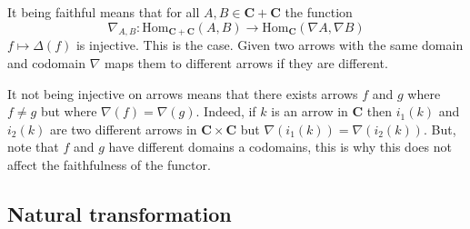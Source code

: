 \documentclass{book}
\theoremstyle{definition}
\newcommand\Hom{\text{Hom}}
\begin{document}
It being faithful means that for all $A, B \in \mathbf{C} + \mathbf{C}$ the function
\[
  \nabla_{A,B} : \Hom_{\mathbf{C}+\mathbf{C}}(A, B) \to \Hom_{\mathbf{C}}(\nabla A, \nabla B)
\]
$f \mapsto \Delta(f)$ is injective. This is the case. Given two arrows with the same domain
and codomain $\nabla$ maps them to different arrows if they are different.

It not being injective on arrows means that there exists arrows $f$ and $g$
where $f \neq g$ but where $\nabla(f) = \nabla(g)$. Indeed, if $k$ is an arrow in
$\mathbf{C}$ then $i_{1}(k)$ and $i_{2}(k)$ are two different arrows in
$\mathbf{C} \times \mathbf{C}$ but $\nabla (i_{1}(k)) = \nabla (i_{2}(k))$. But, note that
$f$ and $g$ have different domains a codomains, this is why this does not affect
the faithfulness of the functor.

\subsection{Natural transformation}
\end{document}
